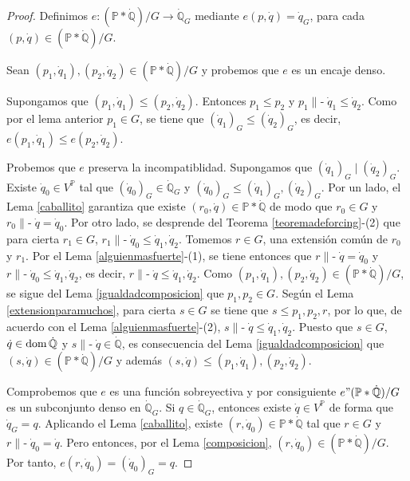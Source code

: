 \documentclass[11pt]{unam_tesis1}
\theoremstyle{MyThmStyle}
\theoremstyle{definition}
\theoremstyle{plain}
\theoremstyle{remark}
\def\dom{\mathop{\rm dom}\nolimits}
\def\forces{\mathop{\parallel\!\!\!-}\nolimits}
\let\Vdash\forces
\let\leq\leqslant
\begin{document}
\begin{proof}
Definimos $e:(\mathbb P *\dot {\mathbb Q})/G \rightarrow \dot {\mathbb Q}_G$ mediante $e(p,\dot q)=\dot {q}_G$, para cada $(p,\dot q)\in (\mathbb P *\dot {\mathbb Q})/G$.

Sean $(p_1,\dot q_1), (p_2, \dot q_2)\in (\mathbb P*\dot{\mathbb Q})/G$ y probemos que $e$ es un encaje denso.

Supongamos que $(p_1,\dot q_1)\leq (p_2, \dot q_2)$. Entonces $p_1\leq p_2$ y $p_1\Vdash \dot q_1\leq \dot q_2$. Como por el lema anterior $p_1\in G$, se tiene que $(\dot q_1)_G\leq (\dot q_2)_G$, es decir, $e(p_1,\dot q_1)\leq e(p_2,\dot q_2)$.

Probemos que $e$ preserva la incompatiblidad. Supongamos que $(\dot q_1)_G\mid (\dot q_2)_G$. Existe $\dot q_0\in V^{\mathbb P}$ tal que $(\dot q_0)_G\in \dot{\mathbb Q}_G$ y $(\dot q_0)_G\leq (\dot q_1)_G, (\dot q_2)_G$. Por un lado, el Lema \ref{caballito} garantiza que existe $(r_0, \dot q)\in \mathbb P*\dot{\mathbb Q}$ de modo que $r_0\in G$ y $r_0\Vdash \dot q=\dot q_0$. Por otro lado, se desprende del Teorema \ref{teoremadeforcing}-(2) que para cierta $r_1\in G$, $r_1 \Vdash \dot q_0 \leq \dot q_1, \dot q_2$. Tomemos $r\in G$, una extensi\'on com\'un de $r_0$ y $r_1$. Por el Lema \ref{alguienmasfuerte}-(1), se tiene entonces que $r\Vdash \dot q=\dot q_0$ y $r\Vdash \dot q_0\leq \dot q_1,\dot q_2$, es decir, $r\Vdash \dot q\leq \dot q_1,\dot q_2$. Como $(p_1,\dot q_1), (p_2,\dot q_2)\in (\mathbb P*\dot{\mathbb Q})/G$, se sigue del Lema \ref{igualdadcomposicion} que $p_1,p_2\in G$. Seg\'un el Lema \ref{extensionparamuchos}, para cierta $s\in G$ se tiene que $s\leq p_1,p_2,r$, por lo que, de acuerdo con el Lema \ref{alguienmasfuerte}-(2), $s\Vdash \dot q\leq \dot q_1,\dot q_2$. Puesto que $s\in G$, $\dot q\in \dom \dot{\mathbb Q}$ y $s\Vdash \dot q\in \dot{\mathbb Q}$, es consecuencia del Lema \ref{igualdadcomposicion} que $(s,\dot q)\in (\mathbb P*\dot{\mathbb Q})/G$ y adem\'as $(s,\dot q)\leq (p_1,\dot q_1),(p_2,\dot q_2)$.

Comprobemos que $e$ es una funci\'on sobreyectiva y por consiguiente $e"(\mathbb P*\dot{\mathbb Q})/G$ es un subconjunto denso en $\dot{\mathbb Q}_G$. Si $q\in \dot{\mathbb Q}_G$, entonces existe $\dot q\in V^{\mathbb P}$ de forma que $\dot q_G=q$. Aplicando el Lema \ref{caballito}, existe $(r,\dot q_0)\in \mathbb P*\dot{\mathbb Q}$ tal que $r\in G$ y $r\Vdash \dot q_0=\dot{q}$. Pero entonces, por el Lema \ref{composicion}, $(r,\dot q_0)\in (\mathbb P*\dot{\mathbb Q})/G$. Por tanto, $e(r,\dot q_0)=(\dot q_0)_G=q$.
\end{proof}
\end{document}
